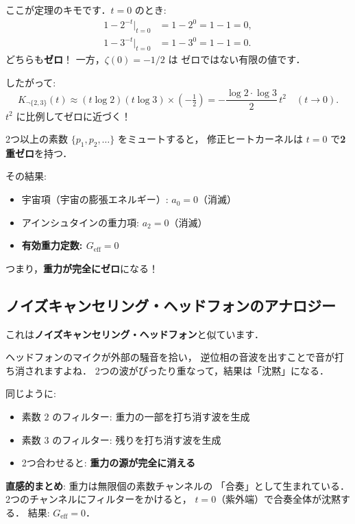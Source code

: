 \documentclass[11pt,a4paper]{article}
\begin{document}
ここが定理のキモです．$t = 0$ のとき:
\begin{align}
  1 - 2^{-t}\Big|_{t=0} &= 1 - 2^0 = 1 - 1 = 0, \\
  1 - 3^{-t}\Big|_{t=0} &= 1 - 3^0 = 1 - 1 = 0.
\end{align}
どちらも\textbf{ゼロ}！ 一方，$\zeta(0) = -1/2$ は
ゼロではない有限の値です．

したがって:
\[
  K_{\neg\{2,3\}}(t) \approx (t \log 2)(t \log 3) \times (-\tfrac{1}{2})
  = -\frac{\log 2 \cdot \log 3}{2}\, t^2 \quad (t \to 0).
\]
$t^2$ に比例してゼロに近づく！

\begin{tcolorbox}[colback=red!5,colframe=red!50!black,title=定理1: 重力無効化]
2つ以上の素数 $\{p_1, p_2, \ldots\}$ をミュートすると，
修正ヒートカーネルは $t = 0$ で\textbf{2重ゼロ}を持つ．

その結果:
\begin{itemize}
  \item 宇宙項（宇宙の膨張エネルギー）: $a_0 = 0$（消滅）
  \item アインシュタインの重力項: $a_2 = 0$（消滅）
  \item \textbf{有効重力定数: $G_{\text{eff}} = 0$}
\end{itemize}
つまり，\textbf{重力が完全にゼロ}になる！
\end{tcolorbox}

\subsection{ノイズキャンセリング・ヘッドフォンのアナロジー}

これは\textbf{ノイズキャンセリング・ヘッドフォン}と似ています．

ヘッドフォンのマイクが外部の騒音を拾い，
逆位相の音波を出すことで音が打ち消されますよね．
2つの波がぴったり重なって，結果は「沈黙」になる．

同じように:
\begin{itemize}
  \item 素数 $2$ のフィルター: 重力の一部を打ち消す波を生成
  \item 素数 $3$ のフィルター: 残りを打ち消す波を生成
  \item 2つ合わせると: \textbf{重力の源が完全に消える}
\end{itemize}

\begin{tcolorbox}[colback=gray!5,colframe=gray!50!black]
\textbf{直感的まとめ}: 重力は無限個の素数チャンネルの
「合奏」として生まれている．
2つのチャンネルにフィルターをかけると，
$t = 0$（紫外端）で合奏全体が沈黙する．
結果: $G_{\text{eff}} = 0$．
\end{tcolorbox}
\end{document}
